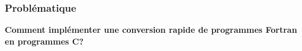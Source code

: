 \documentclass[compress]{beamer} %
\begin{document}
\begin{frame}
\begin{minipage}[t]{0.48\textwidth}
    \end{minipage}
    
	\vspace*{2.9cm}


\end{frame}


\begin{frame}
    \frametitle{Problématique\esp}
    
    \begin{center}
        \textbf{Comment implémenter une conversion rapide de programmes Fortran en programmes C?}
    \end{center}

\end{frame}












% 

% 
\end{document}
